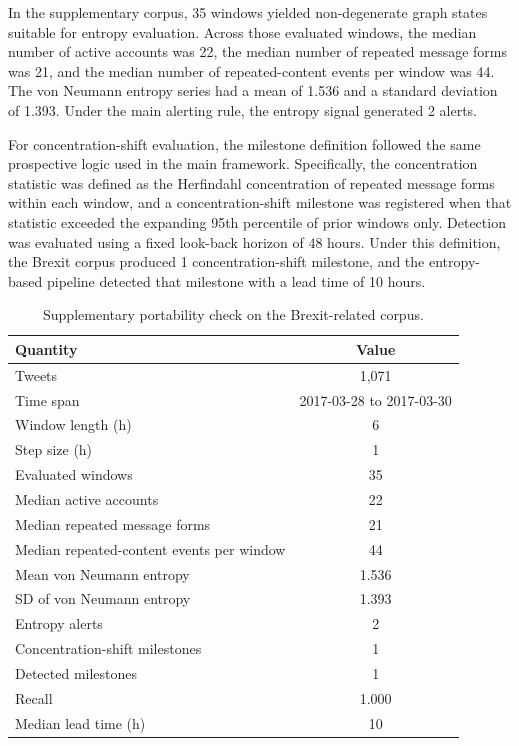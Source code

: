 \documentclass[sigconf]{acmart}
\begin{document}
In the supplementary corpus, 35 windows yielded non-degenerate graph states suitable for entropy evaluation. Across those evaluated windows, the median number of active accounts was 22, the median number of repeated message forms was 21, and the median number of repeated-content events per window was 44. The von Neumann entropy series had a mean of 1.536 and a standard deviation of 1.393. Under the main alerting rule, the entropy signal generated 2 alerts.

For concentration-shift evaluation, the milestone definition followed the same prospective logic used in the main framework. Specifically, the concentration statistic was defined as the Herfindahl concentration of repeated message forms within each window, and a concentration-shift milestone was registered when that statistic exceeded the expanding 95th percentile of prior windows only. Detection was evaluated using a fixed look-back horizon of 48 hours. Under this definition, the Brexit corpus produced 1 concentration-shift milestone, and the entropy-based pipeline detected that milestone with a lead time of 10 hours.

\begin{table}[t]
\caption{Supplementary portability check on the Brexit-related corpus.}
\label{tab:brexit_portability}
\centering
\scriptsize
\setlength{\tabcolsep}{3pt}
\renewcommand{\arraystretch}{1.05}
\begin{tabular}{l c}
\toprule
\textbf{Quantity} & \textbf{Value} \\
\midrule
Tweets & 1,071 \\
Time span & 2017-03-28 to 2017-03-30 \\
Window length (h) & 6 \\
Step size (h) & 1 \\
Evaluated windows & 35 \\
Median active accounts & 22 \\
Median repeated message forms & 21 \\
Median repeated-content events per window & 44 \\
Mean von Neumann entropy & 1.536 \\
SD of von Neumann entropy & 1.393 \\
Entropy alerts & 2 \\
Concentration-shift milestones & 1 \\
Detected milestones & 1 \\
Recall & 1.000 \\
Median lead time (h) & 10 \\
\bottomrule
\end{tabular}
\end{table}
\end{document}
